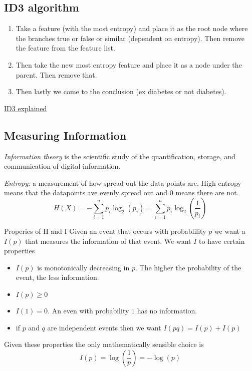 \subsection{ID3 algorithm}
\begin{enumerate}
    \item Take a feature (with the most entropy) and place it as the root node where the branches true or false or similar (dependent on entropy). Then remove the feature from the feature list.
    \item Then take the new most entropy feature and place it as a node under the parent. Then remove that. 
    \item Then lastly we come to the conclusion (ex diabetes or not diabetes).
\end{enumerate}
\href{https://www.youtube.com/watch?v=aLsReomQ7AA}{ID3 explained}

\subsection{Measuring Information}
\textit{Information theory} is the scientific study of the quantification, 
storage, and communication of digital information.

\textit{Entropy}: a measurement of how spread out the data points are. High entropy means 
that the datapoints ave evenly spread out and 0 means there are not.
\begin{equation*}
    H(X) = -\sum_{i=1}^{n} p_i\log_2(p_i) = \sum_{i=1}^{n} p_i\log_2\left(\frac{1}{p_i}\right)
\end{equation*}

Properies of H and I
Given an event that occurs with probablility $p$ we want a $I(p)$ that measures the 
information of that event. We want $I$ to have certain properties
\begin{itemize}
    \item $I(p)$ is monotonically decreasing in $p$. The higher the probability of the 
    event, the less information.
    \item $I(p) \geq 0$
    \item $I(1) = 0$. An even with probability $1$ has no information.
    \item if $p$ and $q$ are independent events then we want $I(pq) = I(p) + I(p)$
\end{itemize}
Given these properties the only mathematically sensible choice is 
\begin{equation*}
    I(p) = \log\left(\frac{1}{p}\right) = -\log(p)
\end{equation*}

